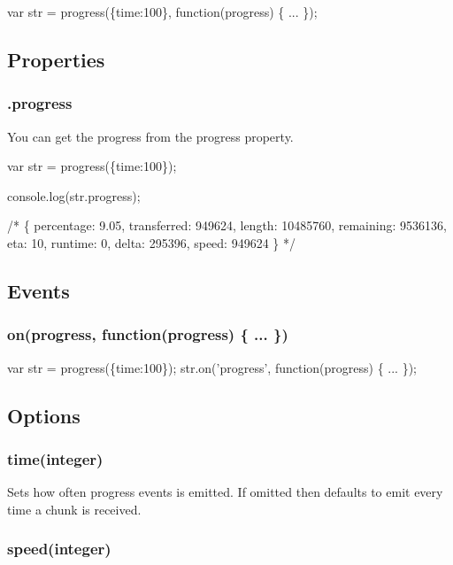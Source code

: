 \begin{DoxyCode}
var str = progress(\{time:100\}, function(progress) \{ ... \});
\end{DoxyCode}


\subsection*{Properties}

\subsubsection*{.progress}

You can get the progress from the progress property.


\begin{DoxyCode}
var str = progress(\{time:100\});

console.log(str.progress);

/*
\{
    percentage: 9.05,
    transferred: 949624,
    length: 10485760,
    remaining: 9536136,
    eta: 10,
    runtime: 0,
    delta: 295396,
    speed: 949624
\}
*/
\end{DoxyCode}


\subsection*{Events}

\subsubsection*{on(\textquotesingle{}progress\textquotesingle{}, function(progress) \{ ... \})}


\begin{DoxyCode}
var str = progress(\{time:100\});
str.on('progress', function(progress) \{ ... \});
\end{DoxyCode}


\subsection*{Options}

\subsubsection*{time(integer)}

Sets how often progress events is emitted. If omitted then defaults to emit every time a chunk is received.

\subsubsection*{speed(integer)}

